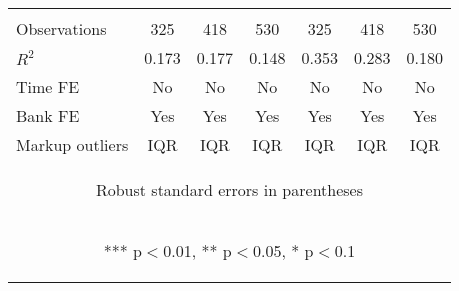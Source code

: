 \documentclass[]{article}
\begin{document}
\begin{center}
\begin{tabular}{lcccccc}
\vspace{4pt} & \begin{footnotesize}\end{footnotesize} & \begin{footnotesize}\end{footnotesize} & \begin{footnotesize}\end{footnotesize} & \begin{footnotesize}\end{footnotesize} & \begin{footnotesize}\end{footnotesize} & \begin{footnotesize}\end{footnotesize} \\
Observations & 325 & 418 & 530 & 325 & 418 & 530 \\
$R^2$ & 0.173 & 0.177 & 0.148 & 0.353 & 0.283 & 0.180 \\
Time FE & No & No & No & No & No & No \\
Bank FE & Yes & Yes & Yes & Yes & Yes & Yes \\
 Markup outliers & IQR & IQR & IQR & IQR & IQR & IQR \\ \hline
\multicolumn{7}{c}{\begin{footnotesize} Robust standard errors in parentheses\end{footnotesize}} \\
\multicolumn{7}{c}{\begin{footnotesize} *** p$<$0.01, ** p$<$0.05, * p$<$0.1\end{footnotesize}} \\
\end{tabular}
\end{center}
\end{document}

